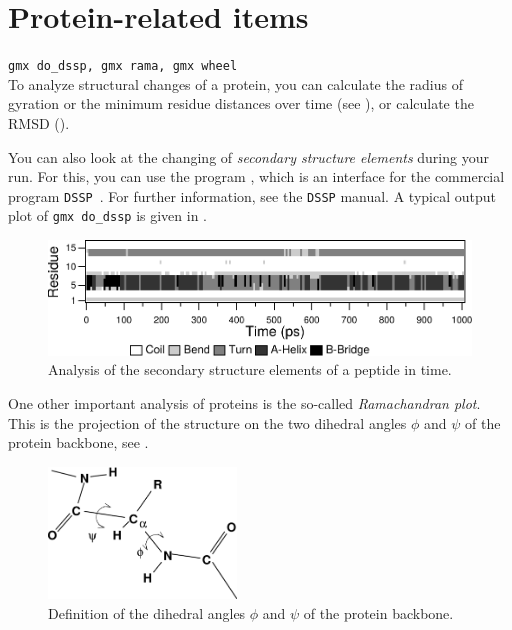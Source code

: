 %

\section{Protein-related items}
{\tt gmx do_dssp, gmx rama, gmx wheel}\\
To analyze structural changes of a protein, you can calculate the radius of 
gyration or the minimum residue distances over time 
(see ), or calculate the RMSD ().

You can also look at the changing of {\em secondary structure elements} 
during your run. For this, you can use the program {\tt {}}, which is 
an interface for the commercial program {\tt DSSP}~\cite{Kabsch83}. For 
further information, see the {\tt DSSP} manual. A typical output plot of 
{\tt gmx do_dssp} is given in .

\begin{figure}
\centerline{
\includegraphics[width=12cm]{plots/dssp}}
\caption{Analysis of the secondary structure elements of a peptide in time.}
\label{fig:dssp}
\end{figure}

One other important analysis of proteins is the so-called 
{\em Ramachandran plot}. 
This is the projection of the structure on the two dihedral angles $\phi$ and 
$\psi$ of the protein backbone, see .

\begin{figure}
\centerline{
\includegraphics[width=5cm]{plots/phipsi}}
\caption{Definition of the dihedral angles $\phi$ and $\psi$ of the protein backbone.}
\label{fig:phipsi}
\end{figure}

